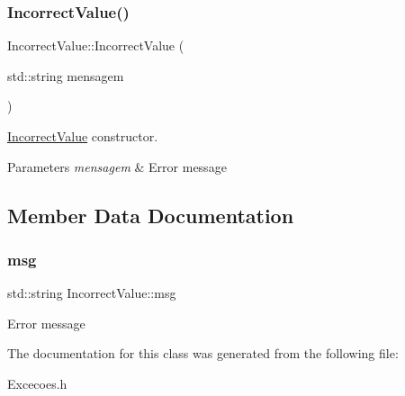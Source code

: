 \subsubsection{\texorpdfstring{Incorrect\+Value()}{IncorrectValue()}}
{\footnotesize\ttfamily Incorrect\+Value\+::\+Incorrect\+Value (\begin{DoxyParamCaption}\item[{std\+::string}]{mensagem }\end{DoxyParamCaption})\hspace{0.3cm}{\ttfamily [inline]}}



\hyperlink{class_incorrect_value}{Incorrect\+Value} constructor. 


\begin{DoxyParams}{Parameters}
{\em mensagem} & Error message \\
\hline
\end{DoxyParams}


\subsection{Member Data Documentation}
\mbox{\label{class_incorrect_value_a3738dbc1c48ca844d3f94a83c4d6dd01}} 
\subsubsection{\texorpdfstring{msg}{msg}}
{\footnotesize\ttfamily std\+::string Incorrect\+Value\+::msg}

Error message 

The documentation for this class was generated from the following file\+:\begin{DoxyCompactItemize}
\item 
Excecoes.\+h\end{DoxyCompactItemize}

